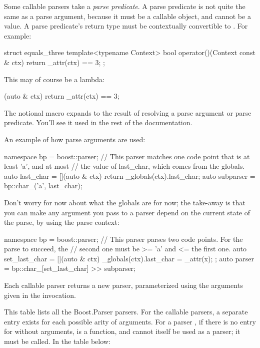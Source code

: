 \documentclass{MyBook}
\begin{document}
Some callable parsers take a \emph{parse predicate}. A parse predicate is not quite the same as a parse argument, because it must be a callable object, and cannot be a value. A parse predicate's return type must be contextually convertible to . For example:

\begin{code}
struct equals_three
{
    template<typename Context>
    bool operator()(Context const & ctx)
    {
        return _attr(ctx) == 3;
    }
};
\end{code}

This may of course be a lambda:

\begin{code}
[](auto & ctx) { return _attr(ctx) == 3; }
\end{code}

The notional macro \emph{}\ci{()} expands to the result of resolving a parse argument or parse predicate. You'll see it used in the rest of the documentation.

An example of how parse arguments are used:

\begin{code}
namespace bp = boost::parser;
// This parser matches one code point that is at least 'a', and at most
// the value of last_char, which comes from the globals.
auto last_char = [](auto & ctx) { return _globals(ctx).last_char; }
auto subparser = bp::char_('a', last_char);
\end{code}

Don't worry for now about what the globals are for now; the take-away is that you can make any argument you pass to a parser depend on the current state of the parse, by using the parse context:

\begin{code}
namespace bp = boost::parser;
// This parser parses two code points.  For the parse to succeed, the
// second one must be >= 'a' and <= the first one.
auto set_last_char = [](auto & ctx) { _globals(ctx).last_char = _attr(x); };
auto parser = bp::char_[set_last_char] >> subparser;
\end{code}

Each callable parser returns a new parser, parameterized using the arguments given in the invocation.

This table lists all the Boost.Parser parsers. For the callable parsers, a separate entry exists for each possible arity of arguments. For a parser , if there is no entry for  without arguments,  is a function, and cannot itself be used as a parser; it must be called. In the table below:
\end{document}
